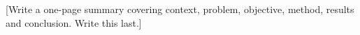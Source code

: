 [Write a one-page summary covering context, problem, objective, method, results and conclusion. Write this last.]
